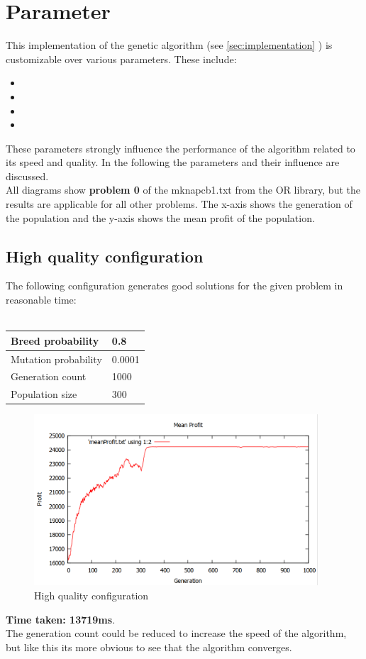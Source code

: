 \documentclass[fontsize=12pt,toc=bibliography, notitlepage]{scrreprt}
\newcommand{\refnn}[1]{\ref{#1} \nameref{#1}}
\begin{document}
\section{Parameter}
\label{sec:parameter}
This implementation of the genetic algorithm (see \refnn{sec:implementation}) is customizable over various parameters. These include:
\begin{itemize}
	\item {}
	\item {}
	\item {}
	\item {}
\end{itemize}
These parameters strongly influence the performance of the algorithm related to its speed and quality. In the following the parameters and their influence are discussed.\\
All diagrams show \textbf{problem 0} of the mknapcb1.txt from the OR library, but the results are applicable for all other problems. The x-axis shows the generation of the population and the y-axis shows the mean profit of the population.

\subsection{High quality configuration}
\label{subsec:good-config}
The following configuration generates good solutions for the given problem in reasonable time: \\ \\
\begin{tabular}{ |l|l| }
	\hline
	Breed probability & 0.8 \\ \hline
	Mutation probability & 0.0001 \\ \hline
	Generation count & 1000 \\ \hline
	Population size & 300 \\ \hline
\end{tabular}
\begin{figure}[H]
	\centering
	\includegraphics[width=400px]{images/good-config.png}
	\caption{High quality configuration}
	\label{fig:good-config}
\end{figure}
\textbf{Time taken: 13719ms}.\\
The generation count could be reduced to increase the speed of the algorithm, but like this its more obvious to see that the algorithm converges.
\end{document}
